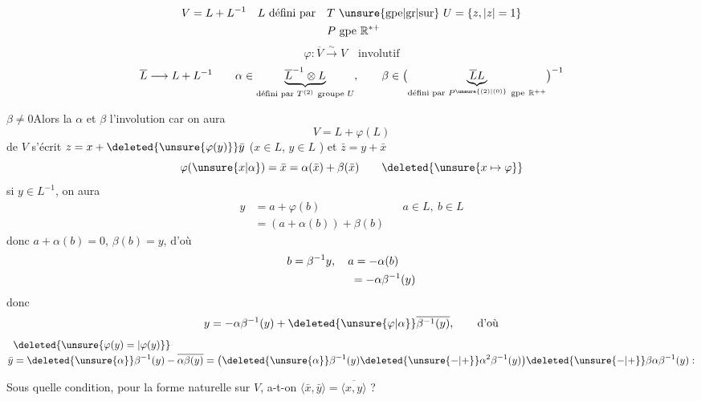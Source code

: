 \[
\begin{aligned}
 V&=L+L^{-1} & L\ \text{défini par}\quad &T\ \text{\unsure{gpe|gr|sur}}\ U=\{z,\lvert z\rvert=1\}\\
 &&&P\ \text{gpe}\ \mathbb R^{*+}
\end{aligned}
\]
\[
 \varphi:\overline V\xrightarrow{\sim}V\quad\text{involutif}
\]
\[
 \overline L\longrightarrow L+L^{-1}\qquad
 \alpha\in\underbrace{\overline L^{-1}\otimes L}_{\text{défini par }T^{(2)}\ \text{groupe }U},
 \qquad \beta\in\bigl(\underbrace{\overline L L}_{\text{défini par }P^{\unsure{(2)|(0)}}\ \text{gpe}\ \mathbb R^{++}}\bigr)^{-1}
\]

$\boxed{\beta\ne0}$\qquad Alors la   $\alpha$ et $\beta$   l'involution car on aura
\[
 V=L+\varphi(L)
\]
  de $V$ s'écrit $z=x+\deleted{\unsure{\varphi(y)}}\bar y$ \quad ($x\in L$, $y\in L$ ) et $\bar z=y+\bar x$
\[
 \varphi(\unsure{x|\alpha})=\bar x=\alpha(\bar x)+\beta(\bar x)\qquad
 \deleted{\unsure{x\mapsto\varphi}}
\]
si $y\in L^{-1}$, on aura
\[
\begin{aligned}
 y&=a+\varphi(b) &&a\in L,\ b\in L\\
  &=(a+\alpha(b))+\beta(b)
\end{aligned}
\]
donc $a+\alpha(b)=0$, $\beta(b)=y$, d'où
\[
\begin{aligned}
 b&=\beta^{-1}y,\quad a=-\alpha(b)\\
 &\hphantom{=\beta^{-1}y,\quad a}=-\alpha\beta^{-1}(y)
\end{aligned}
\]
donc
\[
 y=-\alpha\beta^{-1}(y)+\deleted{\unsure{\varphi|\alpha}}\overline{\beta^{-1}(y)},\qquad\text{d'où}
\]
\[
 \begin{aligned}
 &\deleted{\unsure{\varphi(y)=|\varphi(y)}}\\[-2pt]
 \bar y&=\deleted{\unsure{\alpha}}\beta^{-1}(y)-\overline{\alpha\beta(y)}
 =\bigl(\deleted{\unsure{\alpha}}\beta^{-1}(y)\deleted{\unsure{-|+}}\alpha^2\beta^{-1}(y)\bigr)\deleted{\unsure{-|+}}\beta\alpha\beta^{-1}(y):
 \end{aligned}
\]

Sous quelle condition, pour la forme  naturelle sur $V$, a-t-on $\langle\bar x,\bar y\rangle=\overline{\langle x,y\rangle}$ ?

